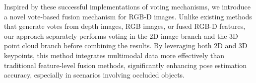 Inspired by these successful implementations of voting mechanisms, we introduce a novel vote-based fusion mechanism for RGB-D images. Unlike existing methods that generate votes from depth images, RGB images, or fused RGB-D features, our approach separately performs voting in the 2D image branch and the 3D point cloud branch before combining the results. By leveraging both 2D and 3D keypoints, this method integrates multimodal data more effectively than traditional feature-level fusion methods, significantly enhancing pose estimation accuracy, especially in scenarios involving occluded objects.
